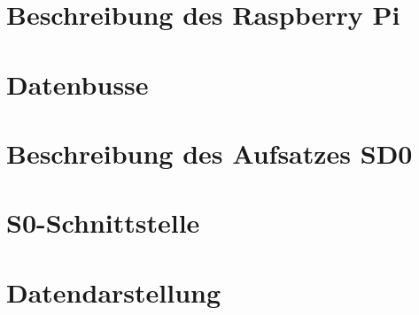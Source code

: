 
\section{Beschreibung des Raspberry Pi}
\label{sec:BeschreibungDesRaspberryPi}



\section{Datenbusse}
\label{sec:Datenbusse}



\section{Beschreibung des Aufsatzes SD0}
\label{sec:BeschreibungDesAufsatzesSD0}



\section{S0-Schnittstelle}
\label{sec:S0Schnittstelle}



\section{Datendarstellung}
\label{sec:Datendarstellung}


